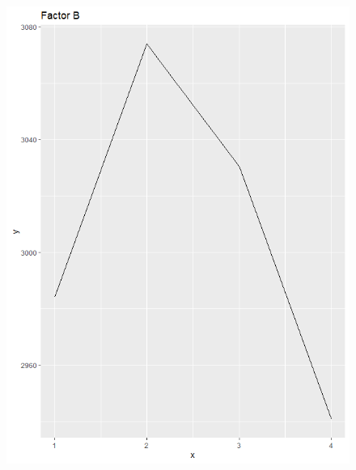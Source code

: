 \begin{figure}[H]
\begin{minipage}[b]{0.33\linewidth}
		\includegraphics[width=1\linewidth]{simulations/taguchi/plots/main_effect_b} 
	\end{minipage}%
	\begin{minipage}[b]{0.33\linewidth}
		\centering

\end{minipage}
\end{figure}
